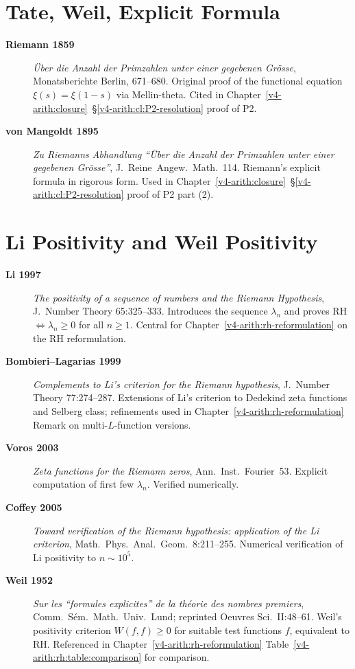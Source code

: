 \section{Tate, Weil, Explicit Formula}
\label{v4-arith:app:A:tate-weil-explicit}

\begin{description}
\item[\textbf{Riemann 1859}] \emph{\"Uber die Anzahl der
Primzahlen unter einer gegebenen Gr\"osse}, Monatsberichte Berlin,
671--680. Original proof of the functional equation
\(\xi(s)=\xi(1-s)\) via Mellin-theta. Cited in
Chapter~\ref{v4-arith:closure}~\S\ref{v4-arith:cl:P2-resolution}
proof of P2.
\item[\textbf{von Mangoldt 1895}] \emph{Zu Riemanns Abhandlung
``\"Uber die Anzahl der Primzahlen unter einer gegebenen
Gr\"osse''}, J.~Reine~Angew.~Math.~114. Riemann's explicit
formula in rigorous form. Used in
Chapter~\ref{v4-arith:closure}~\S\ref{v4-arith:cl:P2-resolution}
proof of P2 part (2).
\end{description}

\section{Li Positivity and Weil Positivity}
\label{v4-arith:app:A:li-weil}

\begin{description}
\item[\textbf{Li 1997}] \emph{The positivity of a sequence of
numbers and the Riemann Hypothesis},
J.~Number Theory 65:325--333.
Introduces the sequence \(\lambda_{n}\) and proves
RH \(\Leftrightarrow\lambda_{n}\geq 0\) for all \(n\geq 1\). Central
for Chapter~\ref{v4-arith:rh-reformulation} on the RH reformulation.
\item[\textbf{Bombieri--Lagarias 1999}] \emph{Complements to Li's
criterion for the Riemann hypothesis}, J.~Number Theory 77:274--287.
Extensions of Li's criterion to Dedekind zeta functions and
Selberg class; refinements used in
Chapter~\ref{v4-arith:rh-reformulation} Remark on
multi-\(L\)-function versions.
\item[\textbf{Voros 2003}] \emph{Zeta functions for the Riemann
zeros}, Ann.~Inst.~Fourier~53. Explicit computation of first few
\(\lambda_{n}\). Verified numerically.
\item[\textbf{Coffey 2005}] \emph{Toward verification of the
Riemann hypothesis: application of the Li criterion},
Math.~Phys.~Anal.~Geom.~8:211--255. Numerical verification of
Li positivity to \(n\sim 10^{5}\).
\item[\textbf{Weil 1952}] \emph{Sur les ``formules explicites'' de
la th\'eorie des nombres premiers}, Comm.~S\'em.~Math.~Univ.~Lund;
reprinted Oeuvres Sci.~II:48--61. Weil's positivity criterion
\(W(f,f)\geq 0\) for suitable test functions \(f\), equivalent to RH.
Referenced in Chapter~\ref{v4-arith:rh-reformulation}
Table~\ref{v4-arith:rh:table:comparison} for comparison.
\end{description}

